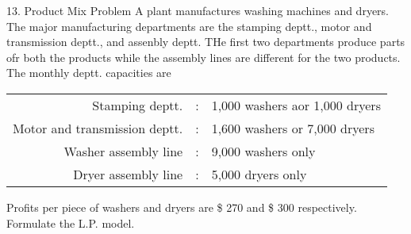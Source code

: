 \begin{frameExample}{13. Product Mix Problem}{}
  A plant manufactures washing machines and dryers. The major manufacturing departments are the stamping deptt., motor and transmission deptt., and assenbly deptt. THe first two departments produce parts ofr both the products while the assembly lines are different for the two products. The monthly deptt. capacities are

  {
    \centering
    \begin{tabular}{rll}
      Stamping deptt. &:& 1,000 washers aor 1,000 dryers\\
      Motor and transmission deptt. &:& 1,600 washers or 7,000 dryers\\
      Washer assembly line &:& 9,000 washers only\\
      Dryer assembly line &:& 5,000 dryers only
    \end{tabular}
    \par
  }

  Profits per piece of washers and dryers are \$ 270 and \$ 300 respectively. Formulate the L.P. model.
\end{frameExample}




